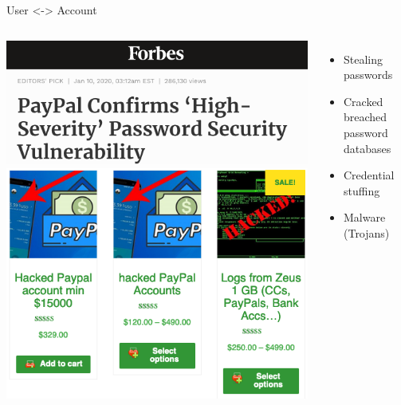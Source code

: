 \documentclass[nobackground,dvipsnames,table,aspectratio=169]{beamer}
\begin{document}
\begin{frame}{User <-> Account}
    \begin{columns}
            \includegraphics[width=\textwidth]{paypal-breach}
            \includegraphics[width=\textwidth]{hacked-paypal-accounts}
            \begin{itemize}
                \item Stealing passwords
                \item Cracked breached password databases
                \item Credential stuffing
                \item Malware (Trojans)
            \end{itemize}
    \end{columns}
\end{frame}
\end{document}
